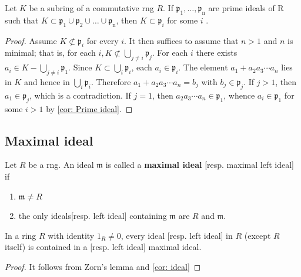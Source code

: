 \begin{theorem}
    \label{thm: lemma of primary decomposition}
    Let $K$ be a subring of a commutative rng $R$.
    If $\mathfrak{p}_1, \ldots, \mathfrak{p}_{\mathrm{n}}$ are prime ideals of R such that $K\subset \mathfrak{p}_1 \cup \mathfrak{p}_2 \cup \ldots \cup \mathfrak{p}_{\mathrm{n}}$, then $K \subset \mathfrak{p}_{i}$ for some $i$ .
    \begin{proof}
        Assume $K \not \subset \mathfrak{p}_i$ for every $i$. It then suffices to assume that $n>1$ and $n$ is minimal; that is, for each $i, K \not \subset \bigcup_{j \neq i} \mathfrak{p}_j$.
        For each $i$ there exists $a_i \in K-\bigcup_{j \neq i} \mathfrak{p}_1$. Since $K \subset \bigcup_i \mathfrak{p}_i$, each $a_i \in \mathfrak{p}_i$. The element $a_1+a_2 a_3 \cdots a_n$ lies in $K$
        and hence in $\bigcup_i \mathfrak{p}_i$. Therefore $a_1+a_2 a_3 \cdots a_n=b_j$ with $b_j \in \mathfrak{p}_j$. If $j>1$, then $a_1 \in \mathfrak{p}_j$, which is a contradiction. If $j=1$, then $a_2 a_3 \cdots a_n \in \mathfrak{p}_1$, whence $a_i \in \mathfrak{p}_1$ for some $i>1$ by \ref{cor: Prime ideal}.
    \end{proof}
\end{theorem}






\subsection{Maximal ideal} %

\begin{definition}
    Let $R$ be a rng. An ideal $\mathfrak{m}$ is called a \textbf{maximal ideal} [resp. maximal left ideal]
    if
    \begin{enumerate}[label=(\roman*)]
        \item  $\mathfrak{m} \neq R$
        \item the only ideals[resp. left ideal] containing $\mathfrak{m}$ are $R$ and $\mathfrak{m}$.
    \end{enumerate}
\end{definition}


\begin{theorem}
    In a ring $R$ with identity $1_R\neq 0$, every ideal [resp. left ideal] in $R$ (except $R$ itself) is contained in a [resp. left ideal] maximal ideal.
    \label{thm: existence of maximal ideal}
    \begin{proof}
        It follows from Zorn's lemma and \ref{cor: ideal}
    \end{proof}
\end{theorem}

